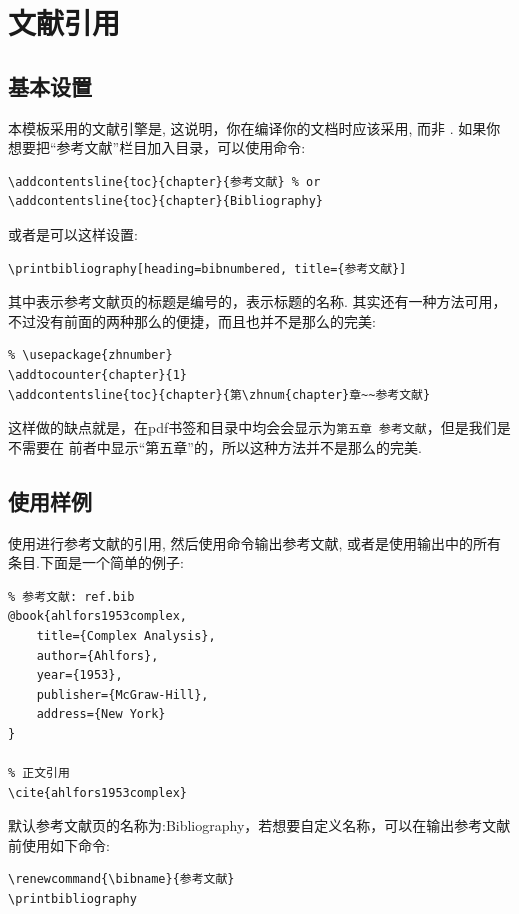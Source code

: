 \section{文献引用}
\subsection{基本设置}
本模板采用的文献引擎是, 这说明，你在编译你的文档时应该采用, 而非
. 如果你想要把``参考文献''栏目加入目录，可以使用命令\cite{ahlfors1953complex}:

\begin{verbatim}
\addcontentsline{toc}{chapter}{参考文献} % or
\addcontentsline{toc}{chapter}{Bibliography}
\end{verbatim}

或者是可以这样设置:
\begin{verbatim}
\printbibliography[heading=bibnumbered, title={参考文献}]
\end{verbatim}

其中表示参考文献页的标题是编号的，表示标题的名称.
其实还有一种方法可用，不过没有前面的两种那么的便捷，而且也并不是那么的完美:
\begin{verbatim}
% \usepackage{zhnumber}
\addtocounter{chapter}{1}
\addcontentsline{toc}{chapter}{第\zhnum{chapter}章~~参考文献}
\end{verbatim}

这样做的缺点就是，在pdf书签和目录中均会会显示为\texttt{第五章  参考文献}，但是我们是不需要在
前者中显示``第五章''的，所以这种方法并不是那么的完美.

\subsection{使用样例}
使用进行参考文献的引用, 然后使用命令\cmd{\printbibliography}输出参考文献,
或者是使用\cmd{\nocite{*}}输出中的所有条目.下面是一个简单的例子:

\begin{verbatim}
% 参考文献: ref.bib
@book{ahlfors1953complex,
    title={Complex Analysis},
    author={Ahlfors},
    year={1953},
    publisher={McGraw-Hill},
    address={New York}
}

% 正文引用
\cite{ahlfors1953complex}
\end{verbatim}

默认参考文献页的名称为:Bibliography，若想要自定义名称，可以在输出参考文献前使用如下命令:
\begin{verbatim}
\renewcommand{\bibname}{参考文献}
\printbibliography
\end{verbatim}


